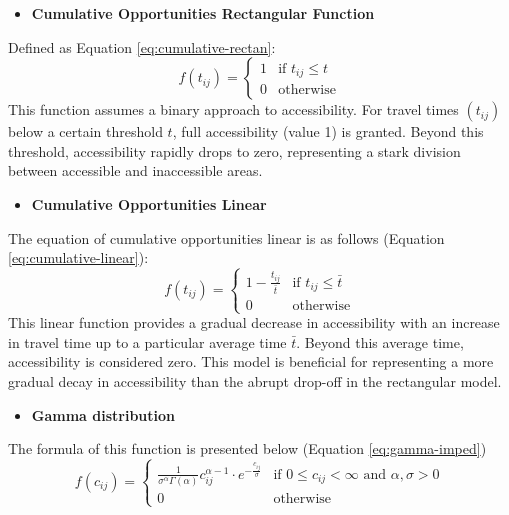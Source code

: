\documentclass[12pt,twoside]{reedthesis}
\providecommand{\tightlist}{%
  \setlength{\itemsep}{0pt}\setlength{\parskip}{0pt}}
\begin{document}
\begin{itemize}
\tightlist
\item
  \textbf{Cumulative Opportunities Rectangular Function}
\end{itemize}
Defined as Equation \eqref{eq:cumulative-rectan}:
\begin{equation}
f(t_{ij}) =
\begin{cases}
  1 & \text{if } t_{ij} \le t \\
  0 & \text{otherwise}
\end{cases}
\label{eq:cumulative-rectan}
\end{equation}
This function assumes a binary approach to accessibility. For travel times \((t_{ij})\) below a certain threshold \(t\), full accessibility (value 1) is granted. Beyond this threshold, accessibility rapidly drops to zero, representing a stark division between accessible and inaccessible areas.
\begin{itemize}
\tightlist
\item
  \textbf{Cumulative Opportunities Linear}
\end{itemize}
The equation of cumulative opportunities linear is as follows (Equation \eqref{eq:cumulative-linear}):
\begin{equation}
f(t_{ij}) =
\begin{cases}
  1 - \frac{t_{ij}}{\bar{t}} & \text{if } t_{ij} \le \bar{t} \\
  0 & \text{otherwise}
\end{cases}
\label{eq:cumulative-linear}
\end{equation}
This linear function provides a gradual decrease in accessibility with an increase in travel time up to a particular average time \(\bar{t}\). Beyond this average time, accessibility is considered zero. This model is beneficial for representing a more gradual decay in accessibility than the abrupt drop-off in the rectangular model.
\begin{itemize}
\tightlist
\item
  \textbf{Gamma distribution}
\end{itemize}
The formula of this function is presented below (Equation \eqref{eq:gamma-imped})
\begin{equation}
f(c_{ij}) = 
\begin{cases}
\frac{1}{\sigma^\alpha\Gamma(\alpha)} c_{ij}^{\alpha-1} \cdot e^{-\frac{c_{ij}}{\sigma}} & \text{if } 0 \leq c_{ij} < \infty  \text{ and } \alpha, \sigma > 0 \\
0 & \text{otherwise}
\end{cases}
\label{eq:gamma-imped}
\end{equation}
\end{document}
